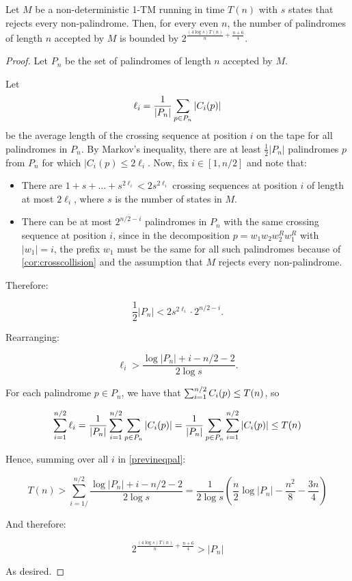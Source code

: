\begin{theorem}
\label{thm:palindromebound}
Let $M$ be a non-deterministic 1-TM running in time $T(n)$ with $s$ states
that rejects every non-palindrome.
Then, for every even $n$, the number of palindromes of length $n$ accepted by $M$ is
bounded by $2^{\frac{(4 \log s) T(n)}{n} + \frac{n+6}{4}}$.
\end{theorem}
\begin{proof}
Let $P_n$ be the set of palindromes of length $n$ accepted by $M$. 

Let $$\ell_i = \frac{1}{|P_n|} \sum_{p \in P_n} |C_i(p)|$$ be the average length of the
crossing sequence at position $i$ on the tape for all palindromes in $P_n$.
By Markov's inequality, there are at least $\frac{1}{2}|P_n|$ palindromes $p$
from $P_n$ for which $|C_i(p) \leq 2\ell_i$.
Now, fix $i \in [1, n/2]$ and note that:

\begin{itemize}
    \item There are $1 + s + \dots + s^{2\ell_i} < 2s^{2\ell_i}$ crossing sequences
    at position $i$
    of length at most $2\ell_i$, where $s$ is the number of states in $M$.
    \item There can be at most $2^{n/2-i}$ palindromes in $P_n$ with the same crossing sequence
    at position $i$,
    since in the decomposition $p = w_1 w_2 w_2^R w_1^R$ with $|w_1| = i$,
    the prefix
    $w_1$ must be the same for all such palindromes because of \cref{cor:crosscollision}
    and the assumption that $M$ rejects every non-palindrome. 
\end{itemize}

Therefore:

$$
\frac{1}{2}|P_n| < 2 s^{2\ell_i} \cdot 2^{n/2-i}.
$$

Rearranging: 

\begin{equation}
\ell_i > \frac{\log |P_n| + i - n/2 - 2}{2 \log s}.
\label{previneqpal}
\end{equation}

For each palindrome $p \in P_n$, we have that $\sum_{i=1}^{n/2} C_i(p) \leq T(n)$, so

$$
\sum_{i=1}^{n/2} \ell_i = \frac{1}{|P_n|} \sum_{i=1}^{n/2} \sum_{p \in P_n} |C_i(p)| = \frac{1}{|P_n|} \sum_{p \in P_n} \sum_{i=1}^{n/2} |C_i(p)|  \leq T(n)
$$

Hence, summing over all $i$ in \eqref{previneqpal}:

$$
T(n) > \sum_{i=1/}^{n/2} \frac{\log |P_n| + i - n/2 - 2}{2 \log s} = \frac{1}{2\log s} \left( \frac{n}{2} \log |P_n| - \frac{n^2}{8} -\frac{3n}{4} \right) 
$$



And therefore:

$$
2^{\frac{(4 \log s) T(n)}{n} + \frac{n+6}{4}} > |P_n|
$$

As desired. 

    
\end{proof}

